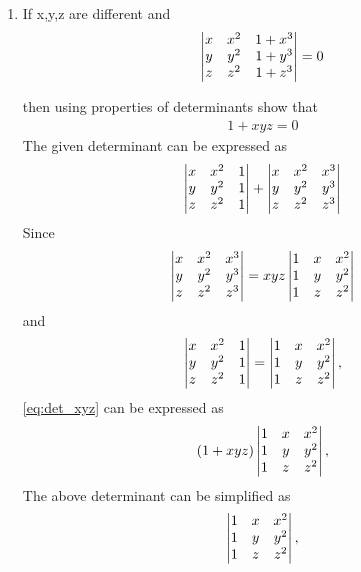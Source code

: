 \documentclass[journal,12pt,twocolumn]{IEEEtran}
\renewcommand\thesection{\arabic{section}}
\begin{document}
\begin{enumerate}[label=\thesection.\arabic*.,ref=\thesection.\theenumi]
\item If x,y,z are different and 
\begin{align}
	\begin{vmatrix}x & x^2 & 1+x^3 \\ y & y^2 & 1+y^3 \\ z & z^2 & 1+z^3 \end{vmatrix} =0 
	\label{eq:det_xyz_given}
    \end{align}

		then using properties of determinants show that \begin{align} 1+xyz=0 \nonumber \end{align}
	\solution The given determinant can be expressed as 
\begin{align}
	\begin{vmatrix}x & x^2 & 1 \\ y & y^2 & 1 \\ z & z^2 & 1\end{vmatrix}  
	+\begin{vmatrix}x & x^2 & x^3 \\ y & y^2 & y^3 \\ z & z^2 & z^3\end{vmatrix}  
	\label{eq:det_xyz}
    \end{align}
    Since
\begin{align}
	\begin{vmatrix}x & x^2 & x^3 \\ y & y^2 & y^3 \\ z & z^2 & z^3\end{vmatrix} 
	= xyz  
	\begin{vmatrix}1 & x & x^2 \\ 1 & y & y^2 \\ 1 & z & z^2\end{vmatrix}  
	\label{eq:det_xyz_2}
    \end{align}
    and 
\begin{align}
	\begin{vmatrix}x & x^2 & 1 \\ y & y^2 & 1 \\ z & z^2 & 1\end{vmatrix} 
	= 
	\begin{vmatrix}1 & x & x^2 \\ 1 & y & y^2 \\ 1 & z & z^2\end{vmatrix}, 
	\label{eq:det_xyz_12}
    \end{align}
	\eqref{eq:det_xyz} can be expressed as
\begin{align}
	\left(1+xyz\right)
	\begin{vmatrix}1 & x & x^2 \\ 1 & y & y^2 \\ 1 & z & z^2\end{vmatrix}, 
	\label{eq:det_xyz_onefac}
    \end{align}
    The above determinant can be simplified as
\begin{align}
	\mydet{1 & x & x^2 \\ 1 & y & y^2 \\ 1 & z & z^2}, 

\end{align}
\end{enumerate}
\end{document}
